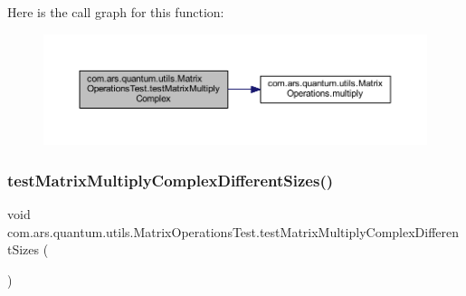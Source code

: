 Here is the call graph for this function\+:\nopagebreak
\begin{figure}[H]
\begin{center}
\leavevmode
\includegraphics[width=350pt]{classcom_1_1ars_1_1quantum_1_1utils_1_1_matrix_operations_test_aa87b6e37af0eb7ae67984f35548d64dc_cgraph}
\end{center}
\end{figure}
\hypertarget{classcom_1_1ars_1_1quantum_1_1utils_1_1_matrix_operations_test_a9ee4aca46fc14b35d2f779747e609239}{}\label{classcom_1_1ars_1_1quantum_1_1utils_1_1_matrix_operations_test_a9ee4aca46fc14b35d2f779747e609239} 
\subsubsection{\texorpdfstring{test\+Matrix\+Multiply\+Complex\+Different\+Sizes()}{testMatrixMultiplyComplexDifferentSizes()}}
{\footnotesize\ttfamily void com.\+ars.\+quantum.\+utils.\+Matrix\+Operations\+Test.\+test\+Matrix\+Multiply\+Complex\+Different\+Sizes (\begin{DoxyParamCaption}{ }\end{DoxyParamCaption})}

